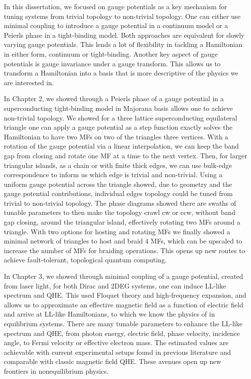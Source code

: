 In this dissertation, we focused on gauge potentials as a key mechanism for tuning systems from trivial topology to non-trivial topology.
One can either use minimal coupling to introduce a gauge potential in a continuum model or a Peierls phase in a tight-binding model.
Both approaches are equivalent for slowly varying gauge potentials.
This lends a lot of flexibility in tackling a Hamiltonian in either form, continuum or tight-binding.
Another key aspect of gauge potentials is gauge invariance under a gauge transform.
This allows us to transform a Hamiltonian into a basis that is more descriptive of the physics we are interested in.

In Chapter 2, we showed through a Peierls phase of a gauge potential in a superconducting tight-binding model in Majorana basis allows one to achieve non-trivial topology.
We showed for a three lattice superconducting equilateral triangle one can apply a gauge potential as a step function exactly solves the Hamiltonian to have two MFs on two of the triangles three vertices.
With a rotation of the gauge potential via a linear interpolation, we can keep the band gap from closing and rotate one MF at a time to the next vertex.
Then, for larger triangular islands, as a chain or with finite thick edges, we can use bulk-edge correspondence to inform us which edge is trivial and non-trivial.
Using a uniform gauge potential across the triangle showed, due to geometry and the gauge potential contributions, individual edges topology could be tuned from trivial to non-trivial topology.
The phase diagrams showed there are swaths of tunable parameters to then make the topology crawl cw or ccw, without band gap closing, around the triangular island, effectively rotating two MFs around a triangle.
With two options for hosting and rotating MFs we finally showed a minimal network of triangles to host and braid 4 MFs, which can be upscaled to increase the number of MFs for braiding operations.
This opens up new routes to achieve fault-tolerant, topological quantum computing.

In Chapter 3, we showed through minimal coupling of a gauge potential, created from laser light, for both Dirac and 2DEG systems, one can induce LL-like spectrum and QHE.
This used Floquet theory and high-frequency expansion, and allows us to approximate an effective magnetic field as a function of electric field and arrive at LL-like Hamiltonians, to which we know the physics of in equilibrium systems.
There are many tunable parameters to enhance the LL-like spectrum and QHE, from photon energy, electric field, phase velocity, incidence angle, to Fermi velocity or effective electron mass.
The estimated values are achievable with current experimental setups found in previous literature and comparable with classic magnetic field QHE.
These avenues open up new frontiers in nonequilibrium physics.

